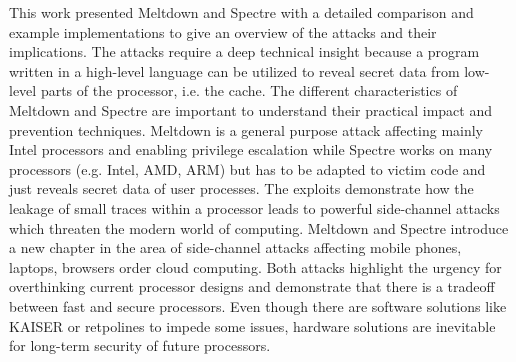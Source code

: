 \documentclass[a4paper,oneside,openright] {scrreprt}
\begin{document}
This work presented Meltdown and Spectre with a detailed comparison and example implementations to give 
an overview of the attacks and their implications.
The attacks require a deep technical insight because a program written in a high-level language can be utilized 
to reveal secret data from low-level parts of the processor, i.e. the cache.
The different characteristics of Meltdown and Spectre are important to understand their practical impact
and prevention techniques.
Meltdown is a general purpose attack affecting mainly Intel processors and enabling privilege escalation while Spectre 
works on many processors (e.g. Intel, AMD, ARM) but has to be adapted to victim code and just reveals secret data of user processes.
The exploits demonstrate how the leakage of small traces within a processor leads to powerful side-channel attacks
which threaten the modern world of computing. 
Meltdown and Spectre introduce a new chapter in the area of side-channel attacks affecting mobile phones, laptops, browsers order
 cloud computing.
Both attacks highlight the urgency for overthinking current processor designs and demonstrate that there is a tradeoff between
fast and secure processors.
Even though there are software solutions like KAISER or retpolines to impede some issues, 
hardware solutions are inevitable for long-term security of future processors.

\lstlistoflistings



\end{document}
